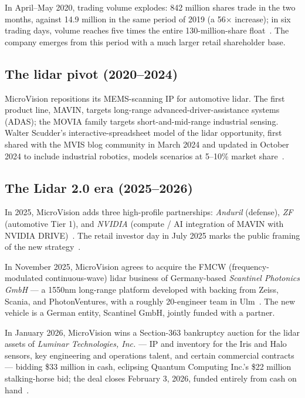 \documentclass[10pt,letterpaper,twocolumn]{article}
\begin{document}
In April--May 2020, trading volume explodes: 842 million shares trade in the two months, against 14.9 million in the same period of 2019 (a 56\(\times\) increase); in six trading days, volume reaches five times the entire 130-million-share float~\citep{scudder2020volume}. The company emerges from this period with a much larger retail shareholder base.

\subsection{The lidar pivot (2020--2024)}

MicroVision repositions its MEMS-scanning IP for automotive lidar. The first product line, MAVIN, targets long-range advanced-driver-assistance systems (ADAS); the MOVIA family targets short-and-mid-range industrial sensing. Walter Scudder's interactive-spreadsheet model of the lidar opportunity, first shared with the MVIS blog community in March 2024 and updated in October 2024 to include industrial robotics, models scenarios at 5--10\% market share~\citep{scudder2024lidar1,scudder2024lidar2}.

\subsection{The Lidar 2.0 era (2025--2026)}

In 2025, MicroVision adds three high-profile partnerships: \emph{Anduril} (defense), \emph{ZF} (automotive Tier 1), and \emph{NVIDIA} (compute / AI integration of MAVIN with NVIDIA DRIVE)~\citep{scudder2025anduril}. The retail investor day in July 2025 marks the public framing of the new strategy~\citep{scudder2025rid}.

In November 2025, MicroVision agrees to acquire the FMCW (frequency-modulated continuous-wave) lidar business of Germany-based \emph{Scantinel Photonics GmbH} --- a 1550nm long-range platform developed with backing from Zeiss, Scania, and PhotonVentures, with a roughly 20-engineer team in Ulm~\citep{mvis2025scantinel,investing2025scantinel}. The new vehicle is a German entity, Scantinel GmbH, jointly funded with a partner.

In January 2026, MicroVision wins a Section-363 bankruptcy auction for the lidar assets of \emph{Luminar Technologies, Inc.} --- IP and inventory for the Iris and Halo sensors, key engineering and operations talent, and certain commercial contracts --- bidding \$33 million in cash, eclipsing Quantum Computing Inc.'s \$22 million stalking-horse bid; the deal closes February 3, 2026, funded entirely from cash on hand~\citep{mvis2026luminar,techcrunch2026luminar,wardsauto2026luminar}.
\end{document}
